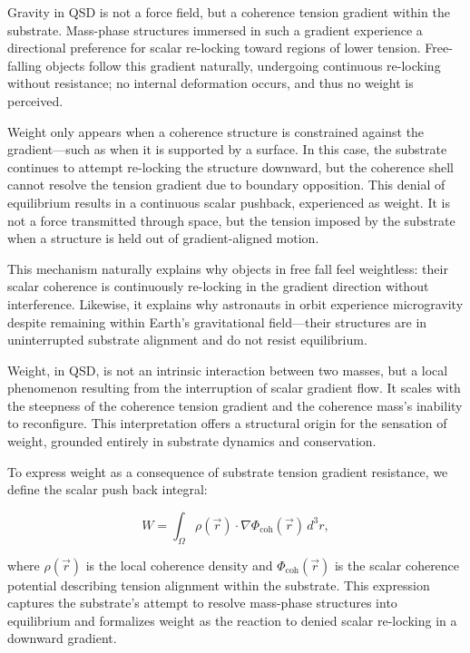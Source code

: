 \documentclass[entropy,article,submit,pdftex,moreauthors]{Definitions/mdpi}
\begin{document}
Gravity in QSD is not a force field, but a coherence tension gradient within the substrate. Mass-phase structures immersed in such a gradient experience a directional preference for scalar re-locking toward regions of lower tension. Free-falling objects follow this gradient naturally, undergoing continuous re-locking without resistance; no internal deformation occurs, and thus no weight is perceived.

Weight only appears when a coherence structure is constrained against the gradient---such as when it is supported by a surface. In this case, the substrate continues to attempt re-locking the structure downward, but the coherence shell cannot resolve the tension gradient due to boundary opposition. This denial of equilibrium results in a continuous scalar pushback, experienced as weight. It is not a force transmitted through space, but the tension imposed by the substrate when a structure is held out of gradient-aligned motion.

This mechanism naturally explains why objects in free fall feel weightless: their scalar coherence is continuously re-locking in the gradient direction without interference. Likewise, it explains why astronauts in orbit experience microgravity despite remaining within Earth's gravitational field---their structures are in uninterrupted substrate alignment and do not resist equilibrium.

Weight, in QSD, is not an intrinsic interaction between two masses, but a local phenomenon resulting from the interruption of scalar gradient flow. It scales with the steepness of the coherence tension gradient and the coherence mass’s inability to reconfigure. This interpretation offers a structural origin for the sensation of weight, grounded entirely in substrate dynamics and conservation.

To express weight as a consequence of substrate tension gradient resistance, we define the scalar push back integral:

\begin{equation}
    W = \int_{\Omega} \rho(\vec{r}) \cdot \nabla \Phi_{\text{coh}}(\vec{r}) \, d^3r,
\end{equation}

where \( \rho(\vec{r}) \) is the local coherence density and \( \Phi_{\text{coh}}(\vec{r}) \) is the scalar coherence potential describing tension alignment within the substrate. This expression captures the substrate’s attempt to resolve mass-phase structures into equilibrium and formalizes weight as the reaction to denied scalar re-locking in a downward gradient.
\end{document}

